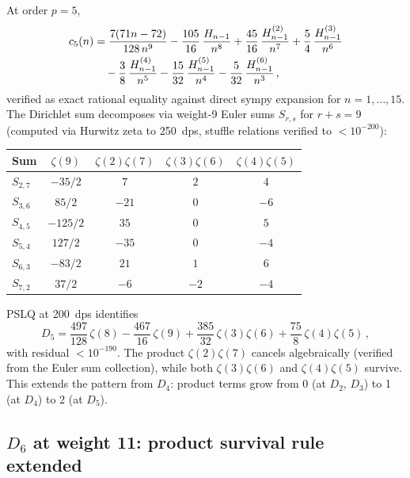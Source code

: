 \documentclass[11pt]{article}
\begin{document}
At order $p = 5$,
\begin{align}
  c_5(n) &= \frac{7(71n - 72)}{128\,n^9}
    - \frac{105}{16}\,\frac{H_{n-1}}{n^8}
    + \frac{45}{16}\,\frac{H_{n-1}^{(2)}}{n^7}
    + \frac{5}{4}\,\frac{H_{n-1}^{(3)}}{n^6}
    \notag \\
    &\quad - \frac{3}{8}\,\frac{H_{n-1}^{(4)}}{n^5}
    - \frac{15}{32}\,\frac{H_{n-1}^{(5)}}{n^4}
    - \frac{5}{32}\,\frac{H_{n-1}^{(6)}}{n^3}\,,
\end{align}
verified as exact rational equality against direct sympy expansion for
$n = 1, \ldots, 15$.
The Dirichlet sum decomposes via weight-9 Euler sums
$S_{r,s}$ for $r + s = 9$ (computed via Hurwitz zeta to 250~dps,
stuffle relations verified to $< 10^{-200}$):
\begin{center}
\begin{tabular}{lcccc}
\hline
Sum & $\zeta(9)$ & $\zeta(2)\zeta(7)$ & $\zeta(3)\zeta(6)$ & $\zeta(4)\zeta(5)$ \\
\hline
$S_{2,7}$ & $-35/2$ & $7$ & $2$ & $4$ \\
$S_{3,6}$ & $85/2$ & $-21$ & $0$ & $-6$ \\
$S_{4,5}$ & $-125/2$ & $35$ & $0$ & $5$ \\
$S_{5,4}$ & $127/2$ & $-35$ & $0$ & $-4$ \\
$S_{6,3}$ & $-83/2$ & $21$ & $1$ & $6$ \\
$S_{7,2}$ & $37/2$ & $-6$ & $-2$ & $-4$ \\
\hline
\end{tabular}
\end{center}
PSLQ at 200~dps identifies
\begin{equation}
\label{eq:D5_decomp}
  D_5 = \frac{497}{128}\,\zeta(8)
  - \frac{467}{16}\,\zeta(9)
  + \frac{385}{32}\,\zeta(3)\zeta(6)
  + \frac{75}{8}\,\zeta(4)\zeta(5)\,,
\end{equation}
with residual $< 10^{-190}$.  The product $\zeta(2)\zeta(7)$ cancels
algebraically (verified from the Euler sum collection), while both
$\zeta(3)\zeta(6)$ and $\zeta(4)\zeta(5)$ survive.  This extends the
pattern from $D_4$: product terms grow from 0 (at $D_2$, $D_3$) to 1
(at $D_4$) to 2 (at $D_5$).

\subsection{$D_6$ at weight 11: product survival rule extended}
\end{document}
